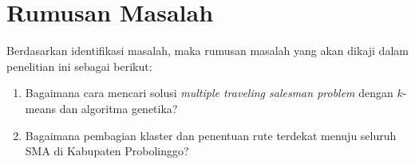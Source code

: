 \section{Rumusan Masalah}

Berdasarkan identifikasi masalah, maka rumusan masalah yang akan dikaji dalam penelitian ini sebagai berikut:
\begin{enumerate}
    \item Bagaimana cara mencari solusi \textit{multiple traveling salesman problem} dengan $k$-means dan algoritma genetika?
    \item Bagaimana pembagian klaster dan penentuan rute terdekat menuju seluruh SMA di Kabupaten Probolinggo?
\end{enumerate}